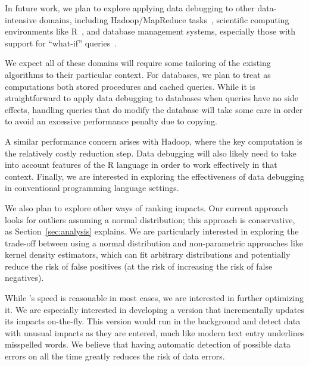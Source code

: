 In future work, we plan to explore applying data debugging to other
data-intensive domains, including Hadoop/MapReduce
tasks~\cite{dean2008mapreduce,hadoop}, scientific computing
environments like R~\cite{ihaka1996r}, and database management
systems, especially those with support for ``what-if''
queries~\cite{Balmin:2000:HQO:645926.672016}.

We expect all of these domains will require some tailoring of the
existing algorithms to their particular context. For databases, we
plan to treat as computations both stored procedures and cached
queries. While it is straightforward to apply data debugging to
databases when queries have no side effects, handling queries that do
modify the database will take some care in order to avoid an excessive
performance penalty due to copying.

A similar performance concern arises with Hadoop, where the key
computation is the relatively costly reduction step. Data debugging
will also likely need to take into account features of the R language
in order to work effectively in that context. Finally, we are
interested in exploring the effectiveness of data debugging in
conventional programming language settings.

We also plan to explore other ways of ranking impacts. Our current
approach looks for outliers assuming a normal distribution; this
approach is conservative, as Section~\ref{sec:analysis} explains. We
are particularly interested in exploring the trade-off between using a
normal distribution and non-parametric approaches like kernel
density estimators, which can fit arbitrary distributions and
potentially reduce the risk of false positives (at the risk of
increasing the risk of false negatives).

While \checkcell{}'s speed is reasonable in most cases, we are
interested in further optimizing it. We are especially interested in
developing a version that incrementally updates its impacts
on-the-fly. This version would run in the background and detect 
data with unusual impacts as they are entered, much like modern text entry
underlines misspelled words. We believe that having automatic
detection of possible data errors on all the time greatly reduces the
risk of data errors.
